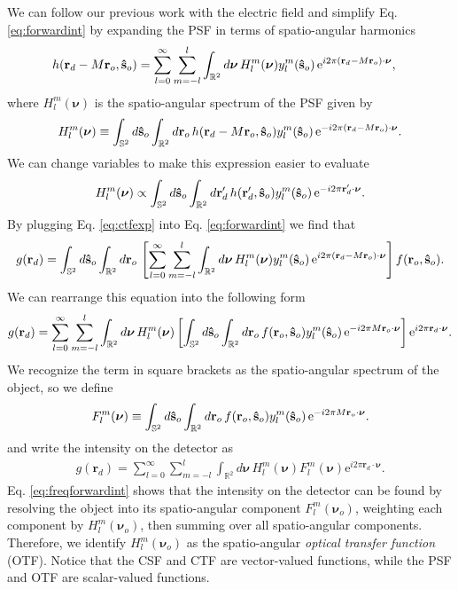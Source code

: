 \documentclass[11pt]{article}
\newcommand{\me}{\mathrm{e}}
\providecommand{\mb}[1]{\mathbf{#1}}
\providecommand{\ro}[1]{\mathbf{\mathbf{r}}_o}
\providecommand{\so}[1]{\mathbf{\hat{s}}_o}
\providecommand{\rd}[1]{\mathbf{r}_d}
\providecommand{\bs}[1]{\boldsymbol{#1}}
\begin{document}
We can follow our previous work with the electric field and simplify Eq.
\ref{eq:forwardint} by expanding the PSF in terms of spatio-angular harmonics
\begin{align}
  h(\rd{} - M\mb{r}_o, \so{}) &= \sum_{l=0}^{\infty} \sum_{m=-l}^l \int_{\mathbb{R}^2}d\bs{\nu}{}\, H_l^m(\bs{\nu})y_l^m(\so{})\thinspace\me^{i 2\pi (\rd{} - M\ro{})\cdot\bs{\nu}},\label{eq:ctfexp}
\end{align}
where $H_l^m(\bs{\nu})$ is the spatio-angular spectrum of the PSF given
by
\begin{align}
  H_l^m(\bs{\nu}) \equiv \int_{\mathbb{S}^2}d\so{}\int_{\mathbb{R}^2}d\ro{}\, h(\rd{} - M\ro{}, \so{}) y_l^m(\so{})\thinspace\me^{-i 2\pi (\rd{} - M\ro{})\cdot\bs{\nu}}.\label{eq:ctfdef}
\end{align}
We can change variables to make this expression easier to evaluate
\begin{align}
  H_l^m(\bs{\nu}) \propto \int_{\mathbb{S}^2}d\so{}\int_{\mathbb{R}^2}d\rd{}'\, h(\rd{}', \so{}) y_l^m(\so{})\thinspace\me^{-i 2\pi \rd{}'\cdot\bs{\nu}}.\label{eq:otfdef2}
\end{align}
By plugging Eq. \ref{eq:ctfexp} into Eq. \ref{eq:forwardint} we find that
\begin{align}
  g(\rd{}) = \int_{\mathbb{S}^2}d\so{}\int_{\mathbb{R}^2}d\ro{}\, \left[\sum_{l=0}^{\infty} \sum_{m=-l}^l \int_{\mathbb{R}^2}d\bs{\nu}{}\, H_l^m(\bs{\nu})y_l^m(\so{})\thinspace\me^{i 2\pi (\rd{} - M\ro{})\cdot\bs{\nu}}\right]f(\ro{}, \so{}). \label{eq:freqforwardint}
\end{align}
We can rearrange this equation into the following form
\begin{align}
  g(\rd{}) = \sum_{l=0}^{\infty} \sum_{m=-l}^l \int_{\mathbb{R}^2}d\bs{\nu}{}\, H_l^m(\bs{\nu}) \left[\int_{\mathbb{S}^2}d\so{}\int_{\mathbb{R}^2}d\ro{}\, f(\ro{}, \so{})y_l^m(\so{})\thinspace\me^{-i 2\pi M\ro{}\cdot\bs{\nu}}\right] \me^{i 2\pi \rd{}\cdot\bs{\nu}}. \label{eq:freqforward}
\end{align}
We recognize the term in square brackets as the spatio-angular spectrum of the
object, so we define
\begin{align}
F_l^m(\bs{\nu}) \equiv \int_{\mathbb{S}^2}d\so{}\int_{\mathbb{R}^2}d\ro{} \, f(\mb{r}_o, \so{}) y_l^m(\so{})\thinspace\me^{-i 2\pi M\ro{}\cdot\bs{\nu}}.  
\end{align}
and write the intensity on the detector as
\begin{align}
  g(\rd{}) = \sum_{l=0}^{\infty} \sum_{m=-l}^l \int_{\mathbb{R}^2}d\bs{\nu}{}\, H_l^m(\bs{\nu}) F_l^m(\mb{\nu}) \me^{i 2\pi \rd{}\cdot\bs{\nu}}. \label{eq:freqforwardint}
\end{align}
Eq. \ref{eq:freqforwardint} shows that the intensity on the detector can be
found by resolving the object into its spatio-angular component
$F_l^m(\mb{\nu}_o)$, weighting each component by $H_l^m(\mb{\nu}_o)$, then
summing over all spatio-angular components. Therefore, we identify
$H_l^m(\mb{\nu}_o)$ as the spatio-angular \textit{optical transfer function}
(OTF). Notice that the CSF and CTF are vector-valued functions, while the PSF
and OTF are scalar-valued functions.
\end{document}
